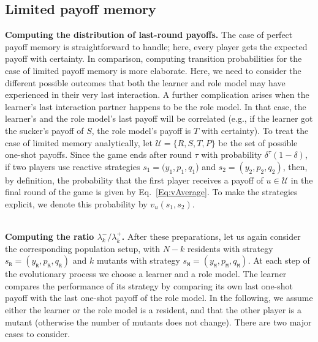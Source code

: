 \documentclass[11pt]{article}
\def\resident{\texttt{R}}
\def\mutant{\texttt{M}}
\def\strategy{s}
\theoremstyle{plainCl1}
\theoremstyle{plainCl2}
\begin{document}

\subsection{Limited payoff memory}\label{section:limited_memory}


{\bf Computing the distribution of last-round payoffs.}
The case of perfect payoff memory is straightforward to handle; here, every player gets the expected payoff with certainty. 
In comparison, computing transition probabilities for the case of limited payoff memory is more elaborate. 
Here, we need to consider the different possible outcomes that both the learner and role model may have experienced in their very last interaction. 
A further complication arises when the learner's last interaction partner happens to be the role model. 
In that case, the learner's and the role model's last payoff will be correlated (e.g., if the learner got the sucker's payoff of $S$, the role model's payoff is $T$ with certainty). 
To treat the case of limited memory analytically, let $\mathcal{U} \!=\! \{R,S,T,P\}$ be the set of possible one-shot payoffs. 
Since the game ends after round $\tau$ with probability $\delta^{\tau}\left(1-\delta\right)$, if two players use reactive strategies $\strategy_1\!=\!(y_1, p_1, q_1$)  and $\strategy_2\!=\!(y_2,p_2,q_2)$, then, by definition, the probability that the first player receives a payoff of $u\!\in\!\mathcal{U}$ in the final round of the game is given by Eq.~\eqref{Eq:vAverage}. To make the strategies explicit, we denote this probability by $v_{u}\!\left(\strategy_{1},\strategy_{2}\right)$.


~\\
\noindent
{\bf Computing the ratio $\lambda^-_k/\lambda^+_k$.}
After these preparations, let us again consider the corresponding population setup, with $N\!-\!k$ residents with strategy  \(\strategy_\resident = (y_\resident, p_\resident, q_\resident)\) and $k$ mutants with strategy  \(\strategy_\mutant = (y_\mutant, p_\mutant, q_\mutant)\).
At each step of the evolutionary process we choose a learner and a role model. 
The learner compares the performance of its strategy by comparing its own last one-shot payoff with the last one-shot payoff of the role model. 
In the following, we assume either the learner or the role model is a resident, and that the other player is a mutant (otherwise the number of mutants does not change). 
There are two major cases to consider. 
\end{document}
